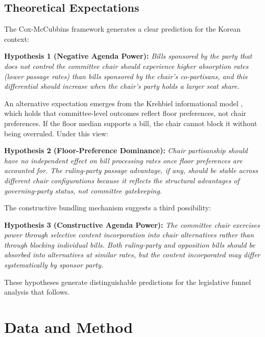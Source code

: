\documentclass[11pt]{article}
\begin{document}
\subsection{Theoretical Expectations}

The Cox-McCubbins framework generates a clear prediction for the Korean context:

\medskip
\noindent \textbf{Hypothesis 1 (Negative Agenda Power):} \textit{Bills sponsored by the party that does not control the committee chair should experience higher absorption rates (lower passage rates) than bills sponsored by the chair's co-partisans, and this differential should increase when the chair's party holds a larger seat share.}

\medskip
An alternative expectation emerges from the Krehbiel informational model \citep{krehbiel1998}, which holds that committee-level outcomes reflect floor preferences, not chair preferences. If the floor median supports a bill, the chair cannot block it without being overruled. Under this view:

\medskip
\noindent \textbf{Hypothesis 2 (Floor-Preference Dominance):} \textit{Chair partisanship should have no independent effect on bill processing rates once floor preferences are accounted for. The ruling-party passage advantage, if any, should be stable across different chair configurations because it reflects the structural advantages of governing-party status, not committee gatekeeping.}

\medskip
The constructive bundling mechanism suggests a third possibility:

\medskip
\noindent \textbf{Hypothesis 3 (Constructive Agenda Power):} \textit{The committee chair exercises power through selective content incorporation into chair alternatives rather than through blocking individual bills. Both ruling-party and opposition bills should be absorbed into alternatives at similar rates, but the content incorporated may differ systematically by sponsor party.}

\medskip
These hypotheses generate distinguishable predictions for the legislative funnel analysis that follows.


\section{Data and Method}
\label{sec:data}
\end{document}
